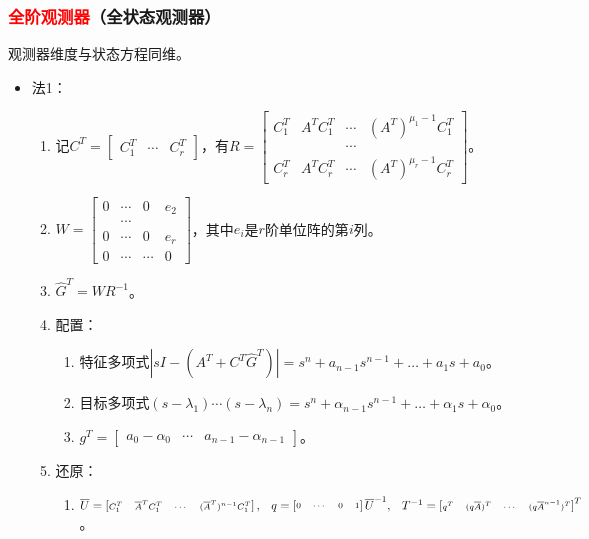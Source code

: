 \documentclass[
12pt, %
a4paper, 
oneside, %
]{scrartcl}
\begin{document}
\subsubsection[全阶观测器]{\textcolor{red}{全阶观测器}（全状态观测器）}
观测器维度与状态方程同维。
\begin{itemize}
\item 法1：
\begin{enumerate}
\item 记$ C^T = \begin{bmatrix} C_1^T & \cdots & C_r^T \end{bmatrix} $，有$ R = \begin{bmatrix} C_1^T & A^T C_1^T & \cdots & (A^T)^{\mu_1 - 1} C_1^T \\ & & \cdots & \\ C_r^T & A^T C_r^T & \cdots & (A^T)^{\mu_r - 1} C_r^T  \end{bmatrix} $。
\item $ W = \begin{bmatrix} 0 & \cdots & 0 & e_2 \\ & \cdots & & \\ 0 & \cdots & 0 & e_r \\ 0 & \cdots & \cdots & 0 \end{bmatrix} $，其中$ e_i $是$ r $阶单位阵的第$ i $列。
\item $ \hat{G}^T = W R^{-1} $。
\item 配置：
\begin{enumerate}
\item 特征多项式$ |sI - (A^T + C^T \hat{G}^T)| = s^n + a_{n - 1} s^{n - 1} + \dots + a_1 s + a_0 $。
\item 目标多项式$ (s - \lambda_1) \cdots (s - \lambda_n) = s^n + \alpha_{n - 1} s^{n - 1} + \dots + \alpha_1 s + \alpha_0 $。
\item $ g^T = \begin{bmatrix} a_0 - \alpha_0 & \cdots & a_{n - 1} - \alpha_{n - 1} \end{bmatrix} $。
\end{enumerate}
\item 还原：
\begin{enumerate}
\item $ {\scriptsize \overline{U} = \begin{bmatrix} C_1^T & \overline{A}^T C_1^T & \cdots & (\overline{A}^T)^{n - 1} C_1^T \end{bmatrix}, \quad q = \begin{bmatrix} 0 & \cdots & 0 & 1 \end{bmatrix} \overline{U}^{-1}, \quad T^{-1} = \begin{bmatrix} q^T & (q \overline{A})^T & \cdots & (q \overline{A}^{n - 1})^T \end{bmatrix}^T} $。

\end{enumerate}
\end{enumerate}
\end{itemize}
\end{document}
